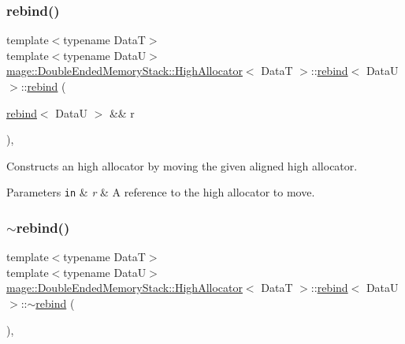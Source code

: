 \subsubsection{\texorpdfstring{rebind()}{rebind()}\hspace{0.1cm}{\footnotesize\ttfamily [3/3]}}
{\footnotesize\ttfamily template$<$typename DataT$>$ \\
template$<$typename DataU$>$ \\
\hyperlink{structmage_1_1_double_ended_memory_stack_1_1_high_allocator}{mage\+::\+Double\+Ended\+Memory\+Stack\+::\+High\+Allocator}$<$ DataT $>$\+::\hyperlink{structmage_1_1_double_ended_memory_stack_1_1_high_allocator_1_1rebind}{rebind}$<$ DataU $>$\+::\hyperlink{structmage_1_1_double_ended_memory_stack_1_1_high_allocator_1_1rebind}{rebind} (\begin{DoxyParamCaption}\item[{\hyperlink{structmage_1_1_double_ended_memory_stack_1_1_high_allocator_1_1rebind}{rebind}$<$ DataU $>$ \&\&}]{r }\end{DoxyParamCaption})\hspace{0.3cm}{\ttfamily [private]}, {\ttfamily [delete]}}

Constructs an high allocator by moving the given aligned high allocator.


\begin{DoxyParams}[1]{Parameters}
\mbox{\tt in}  & {\em r} & A reference to the high allocator to move. \\
\hline
\end{DoxyParams}
\hypertarget{structmage_1_1_double_ended_memory_stack_1_1_high_allocator_1_1rebind_a6773f76027334ab9887e27d71dfe40f7}{}\label{structmage_1_1_double_ended_memory_stack_1_1_high_allocator_1_1rebind_a6773f76027334ab9887e27d71dfe40f7} 
\subsubsection{\texorpdfstring{$\sim$rebind()}{~rebind()}}
{\footnotesize\ttfamily template$<$typename DataT$>$ \\
template$<$typename DataU$>$ \\
\hyperlink{structmage_1_1_double_ended_memory_stack_1_1_high_allocator}{mage\+::\+Double\+Ended\+Memory\+Stack\+::\+High\+Allocator}$<$ DataT $>$\+::\hyperlink{structmage_1_1_double_ended_memory_stack_1_1_high_allocator_1_1rebind}{rebind}$<$ DataU $>$\+::$\sim$\hyperlink{structmage_1_1_double_ended_memory_stack_1_1_high_allocator_1_1rebind}{rebind} (\begin{DoxyParamCaption}{ }\end{DoxyParamCaption})\hspace{0.3cm}{\ttfamily [private]}, {\ttfamily [delete]}}

